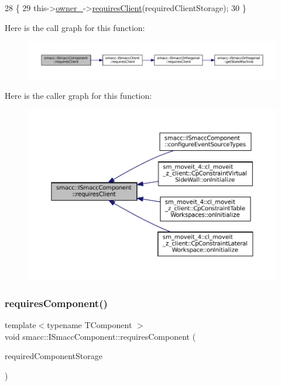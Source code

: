 \begin{DoxyCode}
28     \{
29         this->\hyperlink{classsmacc_1_1ISmaccComponent_a909590e672450ce0eb0d8facb45c737a}{owner\_}->\hyperlink{classsmacc_1_1ISmaccClient_a7a9990a2f3e35d547671188d69fee520}{requiresClient}(requiredClientStorage);
30     \}
\end{DoxyCode}
Here is the call graph for this function\+:
\nopagebreak
\begin{figure}[H]
\begin{center}
\leavevmode
\includegraphics[width=350pt]{classsmacc_1_1ISmaccComponent_a36c085d906fbae0fcaee817aaeafebf4_cgraph}
\end{center}
\end{figure}
Here is the caller graph for this function\+:
\nopagebreak
\begin{figure}[H]
\begin{center}
\leavevmode
\includegraphics[width=350pt]{classsmacc_1_1ISmaccComponent_a36c085d906fbae0fcaee817aaeafebf4_icgraph}
\end{center}
\end{figure}
\mbox{\label{classsmacc_1_1ISmaccComponent_aa06d58b1dcec3c513ca2edddfd3847ec}} 
\subsubsection{\texorpdfstring{requires\+Component()}{requiresComponent()}}
{\footnotesize\ttfamily template$<$typename T\+Component $>$ \\
void smacc\+::\+I\+Smacc\+Component\+::requires\+Component (\begin{DoxyParamCaption}\item[{T\+Component $\ast$\&}]{required\+Component\+Storage }\end{DoxyParamCaption})\hspace{0.3cm}{\ttfamily [protected]}}



